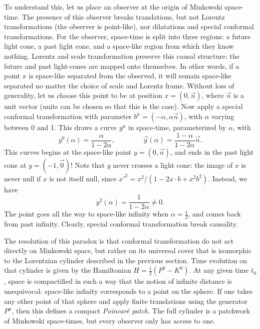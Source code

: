 \documentclass[a4paper,12pt]{article}
\numberwithin{equation}{section}
\begin{document}
To understand this, let us place an observer at the origin of Minkowski space-time. The presence of this observer breaks translations, but not Lorentz transformations (the observer is point-like), nor dilatations and special conformal transformations. For the observer, space-time is split into three regions: a future light cone, a past light cone, and a   space-like region from which they know nothing.
Lorentz and scale transformation preserve this causal structure: the future and past light-cones are mapped onto themselves. In other words, if a point $x$ is space-like separated from the observed, it will remain space-like separated no matter the choice of scale and Lorentz frame. Without loss of generality, let us choose this point to be at position $x = (0, \vec{n})$, where $\vec{n}$ is a unit vector (units can be chosen so that this is the case).
Now apply a special conformal transformation with parameter $b^\mu = (-\alpha, \alpha \vec{n})$, with $\alpha$ varying between 0 and 1.
This draws a curve $y^\mu $ in space-time, parameterized by $\alpha$,
with
\begin{equation}
	y^0(\alpha) = \frac{\alpha}{1 - 2 \alpha},
	\qquad\qquad
	\vec{y}(\alpha) = \frac{1 - \alpha}{1 - 2 \alpha} \vec{n}.
\end{equation}
This curves begins at the space-like point $y = (0, \vec{n})$, and ends in the past light cone at $y = (-1, \vec{0})$!
Note that $y$ never crosses a light cone: the image of $x$ is never null if $x$ is not itself null, since $x'^2 = x^2 / (1 - 2 x \cdot b + x^2 b^2)$.
Instead, we have
\begin{equation}
	y^2(\alpha) = \frac{1}{1 - 2\alpha} \neq 0.
\end{equation}
The point goes all the way to space-like infinity when $\alpha = \frac{1}{2}$, and comes back from past infinity.
Clearly, special conformal transformation break causality.

The resolution of this paradox is that conformal transformation do not act directly on Minkowski space, but rather on its universal cover that is isomorphic to the Lorentzian cylinder described in the previous section.
Time evolution on that cylinder is given by the Hamiltonian $H = \frac{1}{2} (P^0 - K^0)$. At any given time $t_0$, space is compactified in such a way that the notion of infinite distance is unequivocal: space-like infinity corresponds to a point on the sphere. If one takes any other point of that sphere and apply finite translations using the generator $P^\mu$, then this defines a compact \emph{Poincaré patch}. The full cylinder is a patchwork of Minkowski space-times, but every observer only has access to one.
\end{document}
